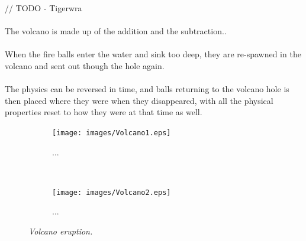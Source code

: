 // TODO - Tigerwra\\
\\
The volcano is made up of the addition and the subtraction..\\
\\
When the fire balls enter the water and sink too deep, they are re-spawned in the volcano and sent out though the hole again.
\\
\\
The physics can be reversed in time, and balls returning to the volcano hole is then placed where they were when they disappeared, with all the physical properties reset to how they were at that time as well.
\\
\begin{figure}[H]
\begin{subfigure}{\textwidth}
  \centering
  \texttt{[image: images/Volcano1.eps]}
  \caption{...}
  \label{fig:vulcano1}
\end{subfigure}%
\\
\begin{subfigure}{\textwidth}
  \centering
  \texttt{[image: images/Volcano2.eps]}
  \caption{...}
  \label{fig:vulcano2}
\end{subfigure}
\caption[Noise comparison]{\textit{Volcano eruption.}}
\label{fig:vulcano3}
\end{figure}



